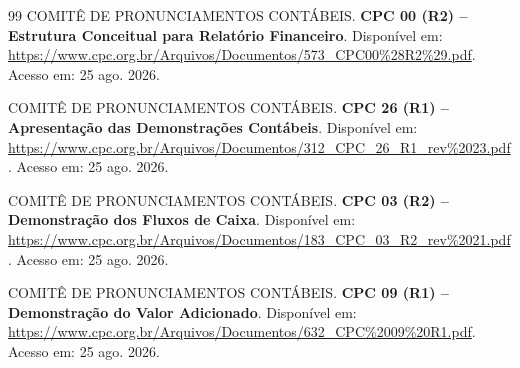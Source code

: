 \documentclass[11pt,a4paper]{article}
\begin{document}
\begin{thebibliography}{99}
COMITÊ DE PRONUNCIAMENTOS CONTÁBEIS. \textbf{CPC 00 (R2) -- Estrutura Conceitual para Relatório Financeiro}. Disponível em: \url{https://www.cpc.org.br/Arquivos/Documentos/573_CPC00%28R2%29.pdf}. Acesso em: 25 ago. 2026.

COMITÊ DE PRONUNCIAMENTOS CONTÁBEIS. \textbf{CPC 26 (R1) -- Apresentação das Demonstrações Contábeis}. Disponível em: \url{https://www.cpc.org.br/Arquivos/Documentos/312_CPC_26_R1_rev%2023.pdf}. Acesso em: 25 ago. 2026.

COMITÊ DE PRONUNCIAMENTOS CONTÁBEIS. \textbf{CPC 03 (R2) -- Demonstração dos Fluxos de Caixa}. Disponível em: \url{https://www.cpc.org.br/Arquivos/Documentos/183_CPC_03_R2_rev%2021.pdf}. Acesso em: 25 ago. 2026.

COMITÊ DE PRONUNCIAMENTOS CONTÁBEIS. \textbf{CPC 09 (R1) -- Demonstração do Valor Adicionado}. Disponível em: \url{https://www.cpc.org.br/Arquivos/Documentos/632_CPC%2009%20R1.pdf}. Acesso em: 25 ago. 2026.

\end{thebibliography}
\normalsize
\end{document}
